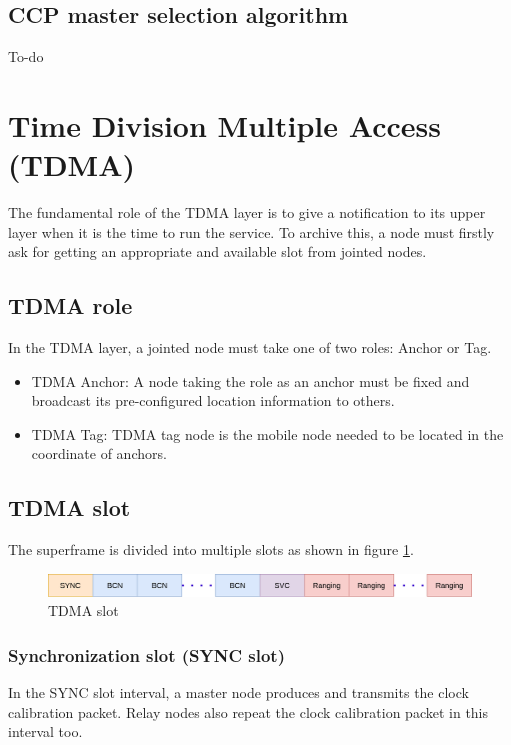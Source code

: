 \documentclass[../../main.tex]{subfiles}
\begin{document}
\subsection{CCP master selection algorithm}
To-do

\section{Time Division Multiple Access (TDMA)}
The fundamental role of the TDMA layer is to give a notification to its upper layer when it is the time to run the service. To archive this, a node must firstly ask for getting an appropriate and available slot from jointed nodes.

\subsection{TDMA role}
In the TDMA layer, a jointed node must take one of two roles: Anchor or Tag.
\begin{itemize}
    \item TDMA Anchor: A node taking the role as an anchor must be fixed and broadcast its pre-configured location information to others.
    \item TDMA Tag: TDMA tag node is the mobile node needed to be located in the coordinate of anchors.
\end{itemize}

\subsection{TDMA slot}
The superframe is divided into multiple slots as shown in figure \ref{fig:tdma_slot}.
\begin{figure}[H]
    \begin{center}
        \includegraphics[scale=0.4]{tdma_slot.png}
    \end{center}
    \caption{TDMA slot}
    \label{fig:tdma_slot}
\end{figure}

\subsubsection{Synchronization slot (SYNC slot)}
In the SYNC slot interval, a master node produces and transmits the clock calibration packet. Relay nodes also repeat the clock calibration packet in this interval too.
\end{document}
